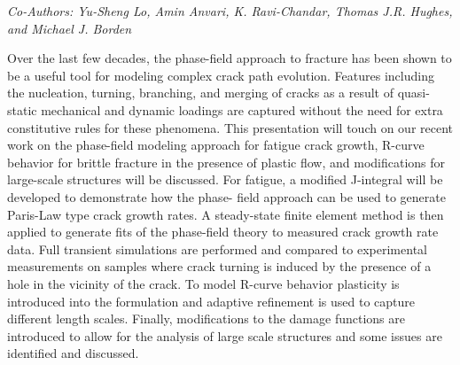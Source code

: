 \begin{center}
\textit{Co-Authors: Yu-Sheng Lo, Amin Anvari, K. Ravi-Chandar, Thomas J.R. Hughes, and
Michael J. Borden}
\end{center} 
Over the last few decades, the phase-field approach to fracture has been shown to be a useful tool
for modeling complex crack path evolution. Features including the nucleation, turning, branching,
and merging of cracks as a result of quasi-static mechanical and dynamic loadings are captured
without the need for extra constitutive rules for these phenomena. This presentation will touch on
our recent work on the phase-field modeling approach for fatigue crack growth, R-curve behavior
for brittle fracture in the presence of plastic flow, and modifications for large-scale structures will
be discussed. For fatigue, a modified J-integral will be developed to demonstrate how the phase-
field approach can be used to generate Paris-Law type crack growth rates. A steady-state finite
element method is then applied to generate fits of the phase-field theory to measured crack growth
rate data. Full transient simulations are performed and compared to experimental measurements on
samples where crack turning is induced by the presence of a hole in the vicinity of the crack. To
model R-curve behavior plasticity is introduced into the formulation and adaptive refinement is used
to capture different length scales. Finally, modifications to the damage functions are introduced to
allow for the analysis of large scale structures and some issues are identified and discussed.
